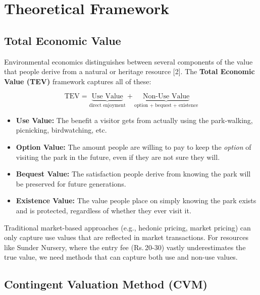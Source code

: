 \documentclass[12pt, a4paper]{article}
\newcommand{\rupee}{\textrm{Rs.}\,}
\begin{document}
\section{Theoretical Framework}

\subsection{Total Economic Value}

Environmental economics distinguishes between several components of the value that people derive from a natural or heritage resource [2]. The \textbf{Total Economic Value (TEV)} framework captures all of these:

\begin{equation}
    \text{TEV} = \underbrace{\text{Use Value}}_{\text{direct enjoyment}} + \underbrace{\text{Non-Use Value}}_{\text{option + bequest + existence}}
    \label{eq:tev}
\end{equation}

\begin{itemize}[nosep]
    \item \textbf{Use Value:} The benefit a visitor gets from actually using the park-walking, picnicking, birdwatching, etc.
    \item \textbf{Option Value:} The amount people are willing to pay to keep the \textit{option} of visiting the park in the future, even if they are not sure they will.
    \item \textbf{Bequest Value:} The satisfaction people derive from knowing the park will be preserved for future generations.
    \item \textbf{Existence Value:} The value people place on simply knowing the park exists and is protected, regardless of whether they ever visit it.
\end{itemize}

Traditional market-based approaches (e.g., hedonic pricing, market pricing) can only capture use values that are reflected in market transactions. For resources like Sunder Nursery, where the entry fee (\rupee 20-30) vastly underestimates the true value, we need methods that can capture both use and non-use values.

\subsection{Contingent Valuation Method (CVM)}
\end{document}
